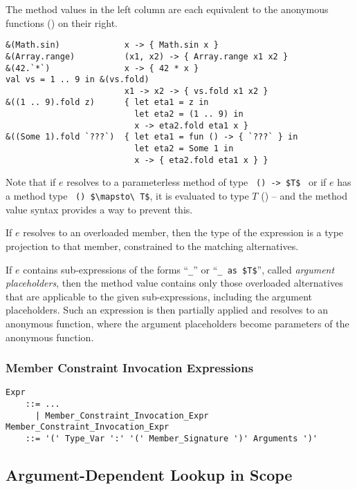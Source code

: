 \example The method values in the left column are each equivalent to the anonymous functions () on their right. 
\begin{lstlisting}[deletekeywords={range}]
&(Math.sin)             x -> { Math.sin x }
&(Array.range)          (x1, x2) -> { Array.range x1 x2 }
&(42.`*`)               x -> { 42 * x }
val vs = 1 .. 9 in &(vs.fold)
                        x1 -> x2 -> { vs.fold x1 x2 }
&((1 .. 9).fold z)      { let eta1 = z in
                          let eta2 = (1 .. 9) in
                          x -> eta2.fold eta1 x }
&((Some 1).fold `???`)  { let eta1 = fun () -> { `???` } in
                          let eta2 = Some 1 in
                          x -> { eta2.fold eta1 x } }
\end{lstlisting}

Note that if $e$ resolves to a parameterless method of type ~\lstinline!() -> $T$!~ or if $e$ has a method type ~\lstinline!() $\mapsto\ T$!, it is evaluated to type $T$ () -- and the method value syntax provides a way to prevent this. 

If $e$ resolves to an overloaded member, then the type of the expression is a type projection to that member, constrained to the matching alternatives. 

If $e$ contains sub-expressions of the forms ``\lstinline!_!'' or ``\lstinline!_ as $T$!'', called {\em argument placeholders}, then the method value contains only those overloaded alternatives that are applicable to the given sub-expressions, including the argument placeholders. Such an expression is then partially applied and resolves to an anonymous function, where the argument placeholders become parameters of the anonymous function. 





\subsubsection{Member Constraint Invocation Expressions}

\grammar\begin{lstlisting}
Expr
    ::= ...
      | Member_Constraint_Invocation_Expr
Member_Constraint_Invocation_Expr
    ::= '(' Type_Var ':' '(' Member_Signature ')' Arguments ')'
\end{lstlisting}





\subsection{Argument-Dependent Lookup in Scope}
\label{sec:adl-scope}

